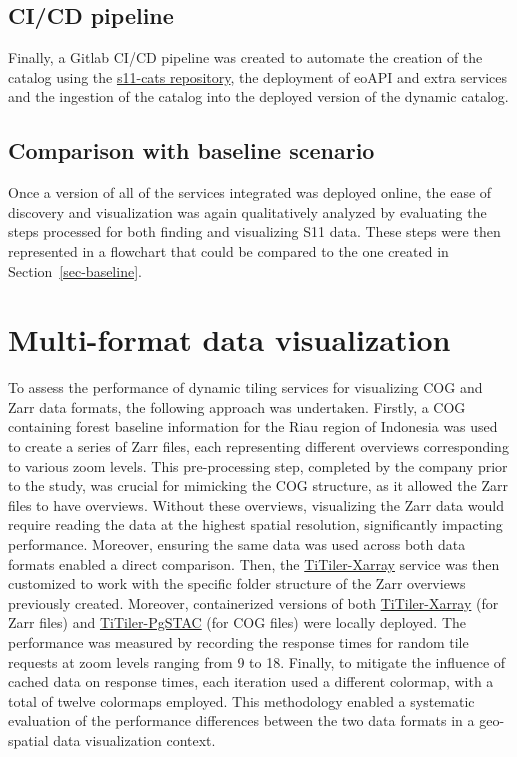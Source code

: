 \documentclass[
  oneside,
  open=any]{scrbook}
\begin{document}
\subsection{CI/CD pipeline}\label{cicd-pipeline}

Finally, a Gitlab CI/CD pipeline was created to automate the creation of
the catalog using the
\href{https://gitlab.com/satelligence/s11-cats}{s11-cats repository},
the deployment of eoAPI and extra services and the ingestion of the
catalog into the deployed version of the dynamic catalog.

\subsection{Comparison with baseline
scenario}\label{comparison-with-baseline-scenario}

Once a version of all of the services integrated was deployed online,
the ease of discovery and visualization was again qualitatively analyzed
by evaluating the steps processed for both finding and visualizing S11
data. These steps were then represented in a flowchart that could be
compared to the one created in Section~\ref{sec-baseline}.

\section{Multi-format data
visualization}\label{multi-format-data-visualization}

To assess the performance of dynamic tiling services for visualizing COG
and Zarr data formats, the following approach was undertaken. Firstly, a
COG containing forest baseline information for the Riau region of
Indonesia was used to create a series of Zarr files, each representing
different overviews corresponding to various zoom levels. This
pre-processing step, completed by the company prior to the study, was
crucial for mimicking the COG structure, as it allowed the Zarr files to
have overviews. Without these overviews, visualizing the Zarr data would
require reading the data at the highest spatial resolution,
significantly impacting performance. Moreover, ensuring the same data
was used across both data formats enabled a direct comparison. Then, the
\href{https://github.com/developmentseed/titiler-xarray}{TiTiler-Xarray}
service was then customized to work with the specific folder structure
of the Zarr overviews previously created. Moreover, containerized
versions of both
\href{https://github.com/developmentseed/titiler-xarray}{TiTiler-Xarray}
(for Zarr files) and
\href{https://github.com/stac-utils/titiler-pgstac}{TiTiler-PgSTAC} (for
COG files) were locally deployed. The performance was measured by
recording the response times for random tile requests at zoom levels
ranging from 9 to 18. Finally, to mitigate the influence of cached data
on response times, each iteration used a different colormap, with a
total of twelve colormaps employed. This methodology enabled a
systematic evaluation of the performance differences between the two
data formats in a geo-spatial data visualization context.
\end{document}
